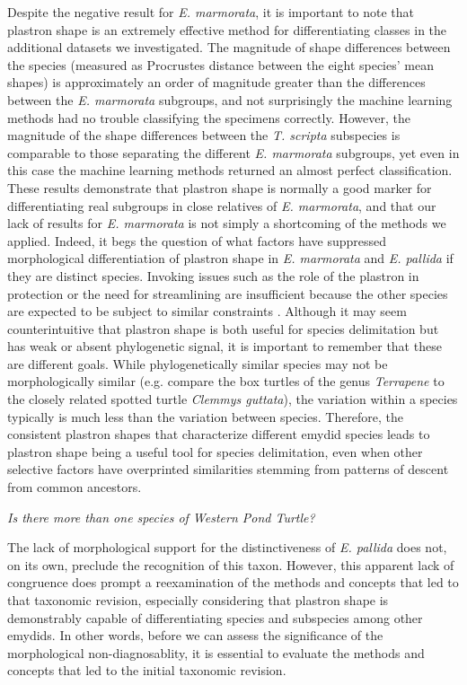 \documentclass[12pt,letterpaper]{article}
\renewcommand{\subsection}[1]{%
\bigskip
\begin{center}
\begin{large}
\normalfont\itshape #1
\end{large}
\end{center}}
\begin{document}
Despite the negative result for \textit{E. marmorata}, it is important to note that plastron shape is an extremely effective method for differentiating classes in the additional datasets we investigated. The magnitude of shape differences between the species (measured as Procrustes distance between the eight species' mean shapes) is approximately an order of magnitude greater than the differences between the \textit{E. marmorata} subgroups, and not surprisingly the machine learning methods had no trouble classifying the specimens correctly. However, the magnitude of the shape differences between the \textit{T. scripta} subspecies is comparable to those separating the different \textit{E. marmorata} subgroups, yet even in this case the machine learning methods returned an almost perfect classification. These results demonstrate that plastron shape is normally a good marker for differentiating real subgroups in close relatives of \textit{E. marmorata}, and that our lack of results for \textit{E. marmorata} is not simply a shortcoming of the methods we applied. Indeed, it begs the question of what factors have suppressed morphological differentiation of plastron shape in \textit{E. marmorata} and \textit{E. pallida} if they are distinct species. Invoking issues such as the role of the plastron in protection or the need for streamlining are insufficient because the other species are expected to be subject to similar constraints \citep{Stayton2011,Polly2016}. Although it may seem counterintuitive that plastron shape is both useful for species delimitation but has weak or absent phylogenetic signal, it is important to remember that these are different goals. While phylogenetically similar species may not be morphologically similar (e.g. compare the box turtles of the genus \textit{Terrapene} to the closely related spotted turtle \textit{Clemmys guttata}), the variation within a species typically is much less than the variation between species. Therefore, the consistent plastron shapes that characterize different emydid species leads to plastron shape being a useful tool for species delimitation, even when other selective factors have overprinted similarities stemming from patterns of descent from common ancestors.

\subsection{Is there more than one species of Western Pond Turtle?}

The lack of morphological support for the distinctiveness of \textit{E. pallida} does not, on its own, preclude the recognition of this taxon. However, this apparent lack of congruence does prompt a reexamination of the methods and concepts that led to that taxonomic revision, especially considering that plastron shape is demonstrably capable of differentiating species and subspecies among other emydids. In other words, before we can assess the significance of the morphological non-diagnosablity, it is essential to evaluate the methods and concepts that led to the initial taxonomic revision. 
\end{document}
